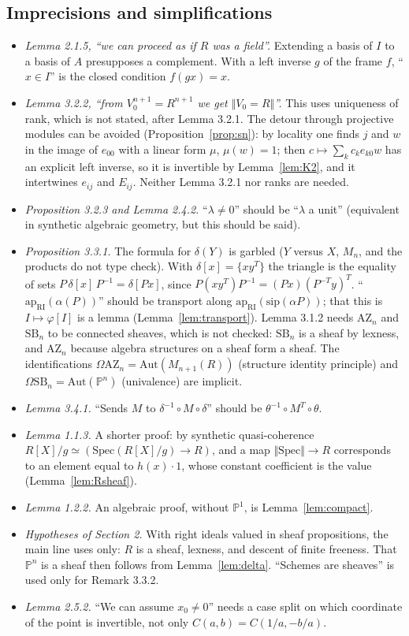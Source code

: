\documentclass[11pt]{amsart}
\theoremstyle{definition}
\theoremstyle{remark}
\newcommand{\Pn}{\mathbb{P}^n}
\newcommand{\AZ}{\mathrm{AZ}_n}
\newcommand{\SB}{\mathrm{SB}_n}
\newcommand{\RI}{\mathrm{RI}}
\newcommand{\Aut}{\mathrm{Aut}}
\newcommand{\tr}[1]{\Vert #1\Vert}
\begin{document}
\subsection*{Imprecisions and simplifications}
\begin{itemize}
\item \emph{Lemma 2.1.5, ``we can proceed as if $R$ was a field''.}
  Extending a basis of $I$ to a basis of $A$ presupposes a complement. With
  a left inverse $g$ of the frame $f$, ``$x\in I$'' is the closed condition
  $f(gx)=x$.
\item \emph{Lemma 3.2.2, ``from $V_0^{n+1}=R^{n+1}$ we get $\tr{V_0=R}$''.}
  This uses uniqueness of rank, which is not stated, after Lemma 3.2.1. The
  detour through projective modules can be avoided
  (Proposition~\ref{prop:sn}): by locality one finds $j$ and $w$ in the
  image of $e_{00}$ with a linear form $\mu$, $\mu(w)=1$; then
  $c\mapsto\sum_kc_ke_{k0}w$ has an explicit left inverse, so it is
  invertible by Lemma~\ref{lem:K2}, and it intertwines $e_{ij}$ and
  $E_{ij}$. Neither Lemma 3.2.1 nor ranks are needed.
\item \emph{Proposition 3.2.3 and Lemma 2.4.2.} ``$\lambda\neq0$'' should be
  ``$\lambda$ a unit'' (equivalent in synthetic algebraic geometry, but
  this should be said).
\item \emph{Proposition 3.3.1.} The formula for $\delta(Y)$ is garbled ($Y$
  versus $X$, $M_n$, and the products do not type check). With
  $\delta[x]=\{xy^T\}$ the triangle is the equality of sets
  $P\,\delta[x]\,P^{-1}=\delta[Px]$, since $P(xy^T)P^{-1}=(Px)(P^{-T}y)^T$.
  ``$\mathrm{ap}_{\RI}(\alpha(P))$'' should be transport along
  $\mathrm{ap}_{\RI}(\mathrm{sip}(\alpha P))$; that this is $I\mapsto
  \varphi[I]$ is a lemma (Lemma~\ref{lem:transport}). Lemma 3.1.2 needs
  $\AZ$ and $\SB$ to be connected sheaves, which is not checked: $\SB$ is a
  sheaf by lexness, and $\AZ$ because algebra structures on a sheaf form a
  sheaf. The identifications $\Omega\AZ=\Aut(M_{n+1}(R))$ (structure identity
  principle) and $\Omega\SB=\Aut(\Pn)$ (univalence) are implicit.
\item \emph{Lemma 3.4.1.} ``Sends $M$ to $\delta^{-1}\circ M\circ\delta$''
  should be $\theta^{-1}\circ M^T\circ\theta$.
\item \emph{Lemma 1.1.3.} A shorter proof: by synthetic quasi-coherence
  $R[X]/g\simeq(\mathrm{Spec}(R[X]/g)\to R)$, and a map $\tr{\mathrm{Spec}}\to
  R$ corresponds to an element equal to $h(x)\cdot1$, whose constant
  coefficient is the value (Lemma~\ref{lem:Rsheaf}).
\item \emph{Lemma 1.2.2.} An algebraic proof, without $\mathbb P^1$, is
  Lemma~\ref{lem:compact}.
\item \emph{Hypotheses of Section 2.} With right ideals valued in sheaf
  propositions, the main line uses only: $R$ is a sheaf, lexness, and
  descent of finite freeness. That $\Pn$ is a sheaf then follows from
  Lemma~\ref{lem:delta}. ``Schemes are sheaves'' is used only for Remark
  3.3.2.
\item \emph{Lemma 2.5.2.} ``We can assume $x_0\neq0$'' needs a case split
  on which coordinate of the point is invertible, not only
  $C(a,b)=C(1/a,-b/a)$.
\end{itemize}
\end{document}
